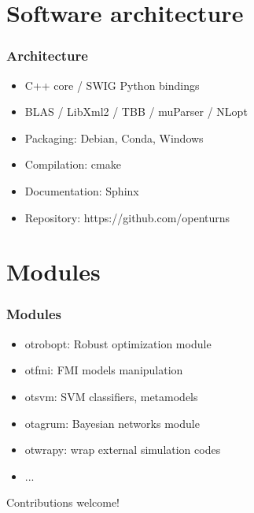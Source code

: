 \documentclass{beamer}
\begin{document}

\section{Software architecture}

\begin{frame}[containsverbatim]
\frametitle{Architecture}

\begin{itemize}
\item C++ core / SWIG Python bindings
\item BLAS / LibXml2 / TBB / muParser / NLopt
\item Packaging: Debian, Conda, Windows
\item Compilation: cmake
\item Documentation: Sphinx
\item Repository: https://github.com/openturns
\end{itemize}

\end{frame}



\section{Modules}

\begin{frame}[containsverbatim]
\frametitle{Modules}

\begin{itemize}
\item otrobopt: Robust optimization module

\item otfmi: FMI models manipulation

\item otsvm: SVM classifiers, metamodels

\item otagrum: Bayesian networks module

\item otwrapy: wrap external simulation codes

\item ...
\end{itemize}

Contributions welcome!

\end{frame}
\end{document}
